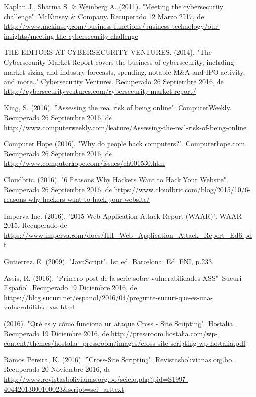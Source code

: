 
\begin{thebibliography}{99}


 Kaplan J., Sharma S. \& Weinberg A. (2011). "Meeting the cybersecurity challenge". McKinsey \& Company. Recuperado 12 Marzo 2017, de \url{http://www.mckinsey.com/business-functions/business-technology/our-insights/meeting-the-cybersecurity-challenge}

 THE EDITORS AT CYBERSECURITY VENTURES. (2014). "The Cybersecurity Market Report covers the business of cybersecurity, including market sizing and industry forecasts, spending, notable M\&A and IPO activity, and more.." Cybersecurity Ventures. Recuperado 26 Septiembre 2016, de \url{http://cybersecurityventures.com/cybersecurity-market-report/}

 King, S. (2016). ''Assessing the real risk of being online". ComputerWeekly. Recuperado 26 Septiembre 2016, de http://\url{www.computerweekly.com/feature/Assessing-the-real-risk-of-being-online}

 Computer Hope (2016). "Why do people hack computers?". Computerhope.com. Recuperado 26 Septiembre 2016, de \url{http://www.computerhope.com/issues/ch001530.htm}

 Cloudbric. (2016). "6 Reasons Why Hackers Want to Hack Your Website". Recuperado 26 Septiembre 2016, de \url{https://www.cloudbric.com/blog/2015/10/6-reasons-why-hackers-want-to-hack-your-website/}

 Imperva Inc. (2016). "2015 Web Application Attack Report (WAAR)". WAAR 2015. Recuperado de \url{https://www.imperva.com/docs/HII\_Web\_Application\_Attack\_Report\_Ed6.pdf}

 Gutierrez, E. (2009). "JavaScript". 1st ed. Barcelona: Ed. ENI, p.233.

 Assis, R. (2016). "Primero post de la serie sobre vulnerabilidades XSS". Sucuri Español. Recuperado 19 Diciembre 2016, de \url{https://blog.sucuri.net/espanol/2016/04/pregunte-sucuri-que-es-una-vulnerabilidad-xss.html}

 (2016). "Qué es y cómo funciona un ataque Cross - Site Scripting". Hostalia. Recuperado 19 Diciembre 2016, de \url{http://pressroom.hostalia.com/wp-content/themes/hostalia\_pressroom/images/cross-site-scripting-wp-hostalia.pdf}

 Ramos Pereira, K. (2016). ''Cross-Site Scripting". Revistasbolivianas.org.bo. Recuperado 20 Noviembre 2016, de \url{http://www.revistasbolivianas.org.bo/scielo.php?pid=S1997-40442013000100023\&script=sci\_arttext}


\end{thebibliography}
